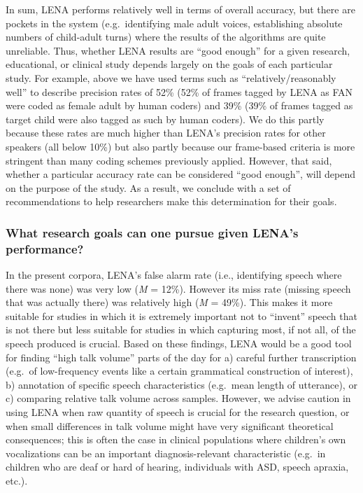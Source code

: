 \documentclass[english,floatsintext,man]{apa6}
\begin{document}
In sum, LENA performs relatively well in terms of overall accuracy, but
there are pockets in the system (e.g.~identifying male adult voices,
establishing absolute numbers of child-adult turns) where the results of
the algorithms are quite unreliable. Thus, whether LENA results are
\enquote{good enough} for a given research, educational, or clinical
study depends largely on the goals of each particular study. For
example, above we have used terms such as \enquote{relatively/reasonably
well} to describe precision rates of 52\% (52\% of frames tagged by LENA
as FAN were coded as female adult by human coders) and 39\% (39\% of
frames tagged as target child were also tagged as such by human coders).
We do this partly because these rates are much higher than LENA's
precision rates for other speakers (all below 10\%) but also partly
because our frame-based criteria is more stringent than many coding
schemes previously applied. However, that said, whether a particular
accuracy rate can be considered \enquote{good enough}, will depend on
the purpose of the study. As a result, we conclude with a set of
recommendations to help researchers make this determination for their
goals.

\subsubsection{What research goals can one pursue given LENA's
performance?}\label{what-research-goals-can-one-pursue-given-lenas-performance}

In the present corpora, LENA's false alarm rate (i.e., identifying
speech where there was none) was very low (\emph{M} = 12\%). However its
miss rate (missing speech that was actually there) was relatively high
(\emph{M} = 49\%). This makes it more suitable for studies in which it
is extremely important not to \enquote{invent} speech that is not there
but less suitable for studies in which capturing most, if not all, of
the speech produced is crucial. Based on these findings, LENA would be a
good tool for finding \enquote{high talk volume} parts of the day for a)
careful further transcription (e.g.~of low-frequency events like a
certain grammatical construction of interest), b) annotation of specific
speech characteristics (e.g.~mean length of utterance), or c) comparing
relative talk volume across samples. However, we advise caution in using
LENA when raw quantity of speech is crucial for the research question,
or when small differences in talk volume might have very significant
theoretical consequences; this is often the case in clinical populations
where children's own vocalizations can be an important
diagnosis-relevant characteristic (e.g.~in children who are deaf or hard
of hearing, individuals with ASD, speech apraxia, etc.).
\end{document}
